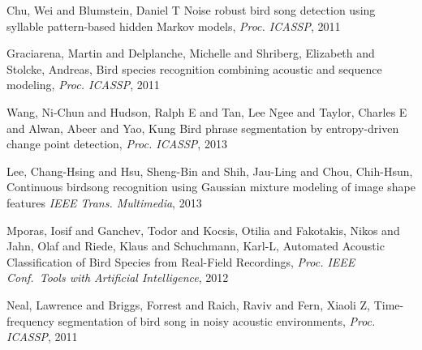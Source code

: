 \documentclass{article}
\begin{document}
\begin{thebibliography}{100}
Chu, Wei and Blumstein, Daniel T
Noise robust bird song detection using syllable pattern-based hidden {M}arkov
models,
\emph{Proc. ICASSP}, 2011

Graciarena, Martin and Delplanche, Michelle and Shriberg, Elizabeth and Stolcke,
Andreas,
Bird species recognition combining acoustic and sequence modeling,
\emph{Proc. ICASSP}, 2011

Wang, Ni-Chun and Hudson, Ralph E and Tan, Lee Ngee and Taylor, Charles E and Alwan, Abeer and Yao, Kung
Bird phrase segmentation by entropy-driven change point detection,
\emph{Proc. ICASSP}, 2013

Lee, Chang-Hsing and Hsu, Sheng-Bin and Shih, Jau-Ling and Chou, Chih-Hsun,
Continuous birdsong recognition using Gaussian mixture modeling of image shape features
\emph{IEEE Trans. Multimedia}, 2013

Mporas, Iosif and Ganchev, Todor and Kocsis, Otilia and Fakotakis, Nikos and
Jahn, Olaf and Riede, Klaus and Schuchmann, Karl-L,
Automated Acoustic Classification of Bird Species from Real-Field Recordings,
\emph{Proc. IEEE Conf.~Tools with Artificial Intelligence}, 2012

Neal, Lawrence and Briggs, Forrest and Raich, Raviv and Fern, Xiaoli Z,
Time-frequency segmentation of bird song in noisy acoustic environments,
\emph{Proc. ICASSP}, 2011



















\end{thebibliography}
    
\end{document}
